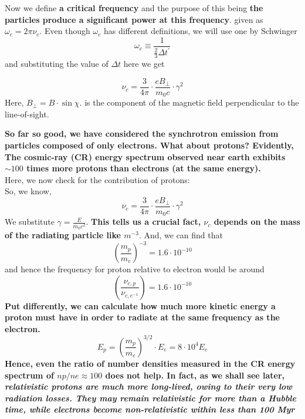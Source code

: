 \documentclass[12pt]{report}
\newcommand{\tbf}[1]{\textbf{#1}}
\newcommand{\tit}[1]{\textit{#1}}
\newcommand{\cbox}{tcolorbox}
\newcommand{\cc}[1]{\left({#1}\right)}
\begin{document}
Now we define \tbf{a critical frequency} and the purpose of this being \tbf{the particles produce a significant power at this frequency}. given as $\omega_c =2 \pi \nu_c$. Even though $\omega_c$ has different definitions, we will use one by Schwinger 
\begin{equation}
\omega_c\equiv \frac{1}{\frac{2}{3}\Delta t^\prime}
\end{equation}
and substituting the value of $\Delta t$ here we get
\begin{\cbox}
\begin{equation}
\nu_c=\frac{3}{4 \pi}\cdot \frac{e B_{\perp}}{m_0c}\cdot \gamma^2
\end{equation}
Here, $B_{\perp}=B \cdot \sin \chi$. is the component of the magnetic field perpendicular to the line-of-sight.
\end{\cbox}
\textbf{So far so good, we have considered the synchrotron emission from particles composed of only electrons. What about protons? Evidently, The cosmic-ray (CR) energy spectrum observed near earth exhibits $\sim 100$ times more protons than electrons (at the same energy).}\\
Here, we now check for the contribution of protons:\\
So, we know,
\begin{equation}
\nu_c=\frac{3}{4 \pi}\cdot \frac{e B_{\perp}}{m_0c}\cdot \gamma^2
\end{equation}
We substitute $\gamma= \frac{E}{m_0c^2}$. 
\textbf{This tells us a crucial fact, $\nu_c$ depends on the mass of the radiating particle like $m^{-3}$}. And, we can find that
\begin{equation}
\cc{\frac{m_p}{m_e}}^{-3}=1.6 \cdot 10^{-10}
\end{equation}
and hence the frequency for proton relative to electron would be around
\begin{equation}
\cc{\frac{\nu_{c,p}}{\nu_{c,e^{-1}}}}=1.6 \cdot 10^{-10}
\end{equation}
\textbf{Put differently, we can calculate how much more kinetic energy a proton must have in order to radiate at the same frequency as the electron.}
\begin{equation}
E_p=\cc{\frac{m_p}{m_e}}^{3/2}\cdot E_e =8\cdot 10^4 E_e
\end{equation}
\textbf{Hence, even the ratio of number densities measured in the CR energy spectrum of $np/ne \approx 100$ does not help. In fact, as we shall see later, \tit{relativistic protons are much more long-lived, owing to their very low radiation losses. They may remain relativistic for more than a Hubble time, while electrons become non-relativistic within less than 100 Myr}}\\
\end{document}

